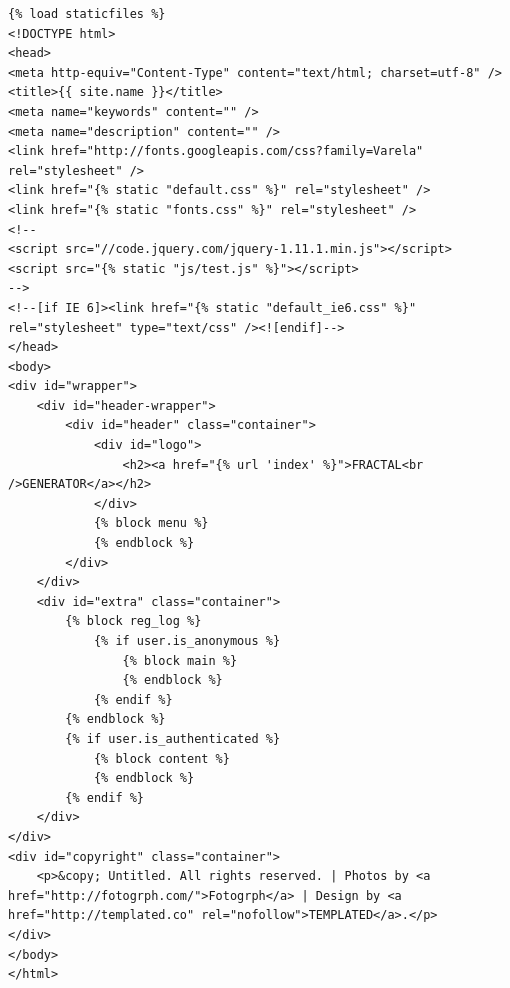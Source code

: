 \documentclass[a4paper]{article}
\begin{document}
\begin{lstlisting}
{% load staticfiles %}
<!DOCTYPE html>
<head>
<meta http-equiv="Content-Type" content="text/html; charset=utf-8" />
<title>{{ site.name }}</title>
<meta name="keywords" content="" />
<meta name="description" content="" />
<link href="http://fonts.googleapis.com/css?family=Varela" rel="stylesheet" />
<link href="{% static "default.css" %}" rel="stylesheet" />
<link href="{% static "fonts.css" %}" rel="stylesheet" />
<!--
<script src="//code.jquery.com/jquery-1.11.1.min.js"></script>
<script src="{% static "js/test.js" %}"></script>
-->
<!--[if IE 6]><link href="{% static "default_ie6.css" %}" rel="stylesheet" type="text/css" /><![endif]-->
</head>
<body>
<div id="wrapper">
	<div id="header-wrapper">
		<div id="header" class="container">
			<div id="logo">
				<h2><a href="{% url 'index' %}">FRACTAL<br />GENERATOR</a></h2>
			</div>
            {% block menu %}
            {% endblock %}
		</div>
	</div>
	<div id="extra" class="container">
        {% block reg_log %}
            {% if user.is_anonymous %}
                {% block main %}
                {% endblock %}
            {% endif %}
        {% endblock %}
        {% if user.is_authenticated %}
		    {% block content %}
            {% endblock %}
        {% endif %}
	</div>
</div>
<div id="copyright" class="container">
	<p>&copy; Untitled. All rights reserved. | Photos by <a href="http://fotogrph.com/">Fotogrph</a> | Design by <a href="http://templated.co" rel="nofollow">TEMPLATED</a>.</p>
</div>
</body>
</html>
\end{lstlisting}
\end{document}
